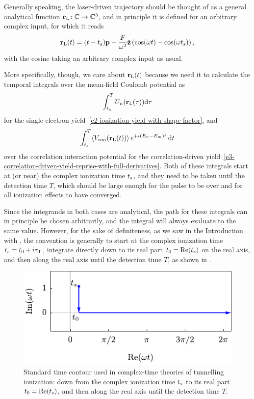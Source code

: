 Generally speaking, the laser-driven trajectory should be thought of as a general analytical function $\vb{r}_\mathrm{L}\colon \mathbb{C}\to \mathbb{C}^3$, and in principle it is defined for an arbitrary complex input, for which it reads
\begin{equation}
\vb{r}_\mathrm{L}(t)=(t-{t_s})\vb{p} +\frac{F}{\omega^2}\hat{\vb{z}} \left(\cos(\omega t) - \cos(\omega {t_s})\right)
,
\label{e5-explicit-rl-trajectory}
\end{equation}
with the cosine taking an arbitrary complex input as usual.

More specifically, though, we care about $\vb{r}_\mathrm{L}(t)$ because we need it to calculate the temporal integrals over the mean-field Coulomb potential as 
\begin{equation}
\int_{t_\kappa}^T U_n(\vb{r}_\mathrm{L}(\tau)) \mathrm{d}\tau
\label{e5-coulomb-rl-integral}
\end{equation}
for the single-electron yield~\eqref{e2-ionization-yield-with-shape-factor}, and 
\begin{equation}
\int_{{t_s}}^T\! \left\langle V_{nm}\mathopen{}\left( \vb{r}_\mathrm{L}(t) \right)\mathclose{} \right\rangle e^{+i(E_n-E_m)t} \: \mathrm{d} t 
\end{equation}
over the correlation interaction potential for the correlation-driven yield~\eqref{e3-correlation-driven-yield-reprise-with-full-derivatives}. Both of these integrals start at (or near) the complex ionization time ${t_s}$, and they need to be taken until the detection time $T$, which should be large enough for the pulse to be over and for all ionization effects to have converged. 

Since the integrands in both cases are analytical, the path for these integrals can in principle be chosen arbitrarily, and the integral will always evaluate to the same value. However, for the sake of definiteness, as we saw in the Introduction with , the convention is generally to start at the complex ionization time ${t_s} = {t_0} + i{\tau_\mathrm{T}}$, integrate directly down to its real part ${t_0}=\Re({t_s})$ on the real axis, and then along the real axis until the detection time $T$, as shown in .


\begin{figure}[htb]
\centering
\includegraphics[scale=1]{5-Quantum-orbits/Figures/figure5B.pdf}
\caption[Standard integration path in the complex time plane, from the ionization time $t_s$ to its real part and then along the real axis]{Standard time contour used in complex-time theories of tunnelling ionization: down from the complex ionization time ${t_s}$ to its real part ${t_0}=\Re({t_s})$, and then along the real axis until the detection time $T$.}
\label{f5-standard-time-contour}
\end{figure}


